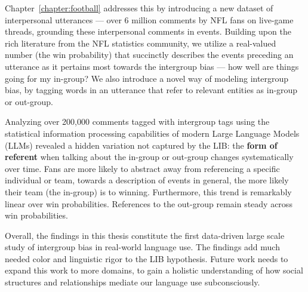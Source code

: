 Chapter~\ref{chapter:football} addresses this by introducing a new dataset of interpersonal utterances --- over 6 million comments by NFL fans on live-game threads, grounding these interpersonal comments in events. Building upon the rich literature from the NFL statistics community, we utilize a real-valued number (the win probability) that succinctly describes the events preceding an utterance as it pertains most towards the intergroup bias --- how well are things going for my in-group? We also introduce a novel way of modeling intergroup bias, by tagging words in an utterance that refer to relevant entities as in-group or out-group. 

Analyzing over 200,000 comments tagged with intergroup tags using the statistical information processing capabilities of modern Large Language Models (LLMs) revealed a hidden variation not captured by the LIB: the \textbf{form of referent} when talking about the in-group or out-group changes systematically over time. Fans are more likely to abstract away from referencing a specific individual or team, towards a description of events in general, the more likely their team (the in-group) is to winning. Furthermore, this trend is remarkably linear over win probabilities. References to the out-group remain steady across win probabilities.

Overall, the findings in this thesis constitute the first data-driven large scale study of intergroup bias in real-world language use. The findings add much needed color and linguistic rigor to the LIB hypothesis. Future work needs to expand this work to more domains, to gain a holistic understanding of how social structures and relationships mediate our language use subconsciously.

